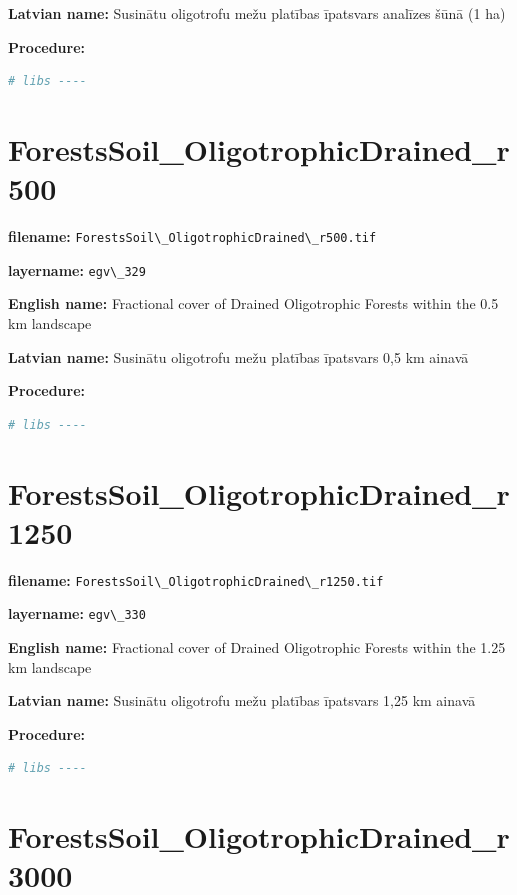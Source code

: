 \documentclass[
]{book}
\newcommand{\passthrough}[1]{#1}
\begin{document}
\textbf{Latvian name:} Susinātu oligotrofu mežu platības īpatsvars analīzes šūnā (1 ha)

\textbf{Procedure:}

\begin{lstlisting}[language=R]
# libs ----
\end{lstlisting}

\section{ForestsSoil\_OligotrophicDrained\_r500}\label{ch06.329}

\textbf{filename:} \passthrough{\lstinline!ForestsSoil\_OligotrophicDrained\_r500.tif!}

\textbf{layername:} \passthrough{\lstinline!egv\_329!}

\textbf{English name:} Fractional cover of Drained Oligotrophic Forests within the 0.5 km landscape

\textbf{Latvian name:} Susinātu oligotrofu mežu platības īpatsvars 0,5 km ainavā

\textbf{Procedure:}

\begin{lstlisting}[language=R]
# libs ----
\end{lstlisting}

\section{ForestsSoil\_OligotrophicDrained\_r1250}\label{ch06.330}

\textbf{filename:} \passthrough{\lstinline!ForestsSoil\_OligotrophicDrained\_r1250.tif!}

\textbf{layername:} \passthrough{\lstinline!egv\_330!}

\textbf{English name:} Fractional cover of Drained Oligotrophic Forests within the 1.25 km landscape

\textbf{Latvian name:} Susinātu oligotrofu mežu platības īpatsvars 1,25 km ainavā

\textbf{Procedure:}

\begin{lstlisting}[language=R]
# libs ----
\end{lstlisting}

\section{ForestsSoil\_OligotrophicDrained\_r3000}\label{ch06.331}
\end{document}
